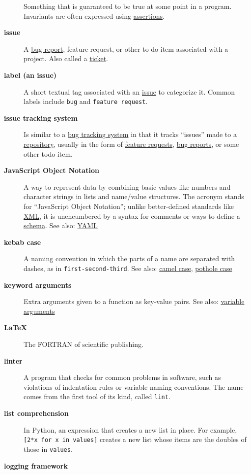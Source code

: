 \documentclass[
]{krantz}
\begin{document}
\begin{description}
Something that is guaranteed to be true at some point in a program. Invariants are often expressed using \protect\hyperlink{assertion}{assertions}.
\item[\textbf{issue}]
A \protect\hyperlink{bug_report}{bug report}, feature request, or other to-do item associated with a project. Also called a \protect\hyperlink{ticket}{ticket}.
\item[\textbf{label (an issue)}]
A short textual tag associated with an \protect\hyperlink{issue}{issue} to categorize it. Common labels include \texttt{bug} and \texttt{feature\ request}.
\item[\textbf{issue tracking system}]
Is similar to a \protect\hyperlink{bug_tracker}{bug tracking system} in that it tracks ``issues'' made to a \protect\hyperlink{repository}{repository}, usually in the form of \protect\hyperlink{feature_request}{feature requests}, \protect\hyperlink{bug_report}{bug reports}, or some other todo item.
\item[\textbf{JavaScript Object Notation}]
A way to represent data by combining basic values like numbers and character strings in lists and name/value structures. The acronym stands for ``JavaScript Object Notation''; unlike better-defined standards like \protect\hyperlink{xml}{XML}, it is unencumbered by a syntax for comments or ways to define a \protect\hyperlink{schema}{schema}. See also: \protect\hyperlink{yaml}{YAML}
\item[\textbf{kebab case}]
A naming convention in which the parts of a name are separated with dashes, as in \texttt{first-second-third}. See also: \protect\hyperlink{camel_case}{camel case}, \protect\hyperlink{pothole_case}{pothole case}
\item[\textbf{keyword arguments}]
Extra arguments given to a function as key-value pairs. See also: \protect\hyperlink{variable_arguments}{variable arguments}
\item[\textbf{LaTeX}]
The FORTRAN of scientific publishing.
\item[\textbf{linter}]
A program that checks for common problems in software, such as violations of indentation rules or variable naming conventions. The name comes from the first tool of its kind, called \texttt{lint}.
\item[\textbf{list comprehension}]
In Python, an expression that creates a new list in place. For example, \texttt{{[}2*x\ for\ x\ in\ values{]}} creates a new list whose items are the doubles of those in \texttt{values}.
\item[\textbf{logging framework}]

\end{description}
\end{document}
